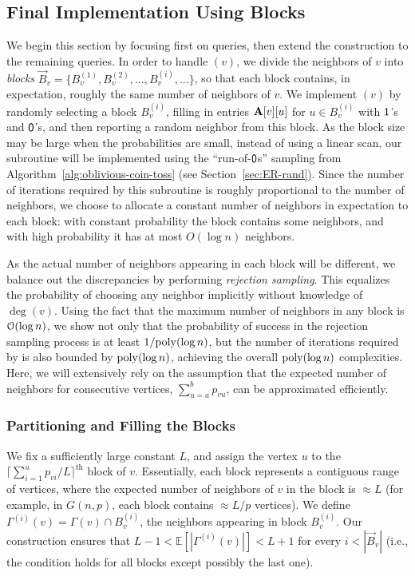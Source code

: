 \subsection{Final Implementation Using Blocks}
\label{sec:blocks}
We begin this section by focusing first on  queries, then extend the construction to the remaining queries.
In order to handle $(v)$, we divide the neighbors of $v$ into \emph{blocks}
$\vec B_v = \{ B^{(1)}_v, B^{(2)}_v, \ldots, B^{(i)}_v, \ldots\}$,
so that each block contains, in expectation, roughly the same number of neighbors of $v$.
We implement $(v)$ by randomly selecting a block $B^{(i)}_v$,
filling in entries $\mathbf{A}[v][u]$ for $u \in B^{(i)}_v$ with $\mathsf{1}$'s and $\mathsf{0}$'s, and then reporting a random neighbor from this block.
As the block size may be large when the probabilities are small, instead of using a linear scan,
our  subroutine will be implemented using the ``run-of-$\mathsf{0}$s'' sampling from  Algorithm~\ref{alg:oblivious-coin-toss}
(see Section~\ref{sec:ER-rand}).
Since the number of iterations required by this subroutine is roughly proportional to the number of neighbors,
we choose to allocate a constant number of neighbors in expectation to each block:
with constant probability the block contains some neighbors, and with high probability it has at most $O(\log n)$ neighbors.

As the actual number of neighbors appearing in each block will be different,
we balance out the discrepancies by performing \emph{rejection sampling}.
This equalizes the probability of choosing any neighbor implicitly without knowledge of $\deg(v)$.
Using the fact that the maximum number of neighbors in any block is $\Bo(\log n)$,
we show not only that the probability of success in the rejection sampling process is at least $1/\mathrm{poly}(\log n)$,
but the number of iterations required by  is also bounded by $\mathrm{poly}(\log n)$, achieving the overall $\mathrm{poly}(\log n)$ complexities.
Here, we will extensively rely on the assumption that the expected number of neighbors for consecutive vertices,
$\sum_{u=a}^b p_{vu}$, can be approximated efficiently.

\subsubsection{Partitioning and Filling the Blocks}
\label{sec:block_partitioning_and_filling}
We fix a sufficiently large constant $L$, and assign the vertex $u$ to the $\lceil\sum^{u}_{i=1} p_{vi}/L\rceil^\textrm{th}$ block of $v$.
Essentially, each block represents a contiguous range of vertices, where the expected number of neighbors of $v$ in the block is $\approx L$
(for example, in $G(n,p)$, each block contains $\approx L/p$ vertices).
We define $\Gamma^{(i)}(v) = \Gamma(v) \cap B^{(i)}_v$, the neighbors appearing in block $B^{(i)}_v$.
Our construction ensures that $L-1 < \mathbb E \left[|\Gamma^{(i)}(v)|\right] < L+1$ for every $i < |\vec B_v|$
(i.e., the condition holds for all blocks except possibly the last one).

